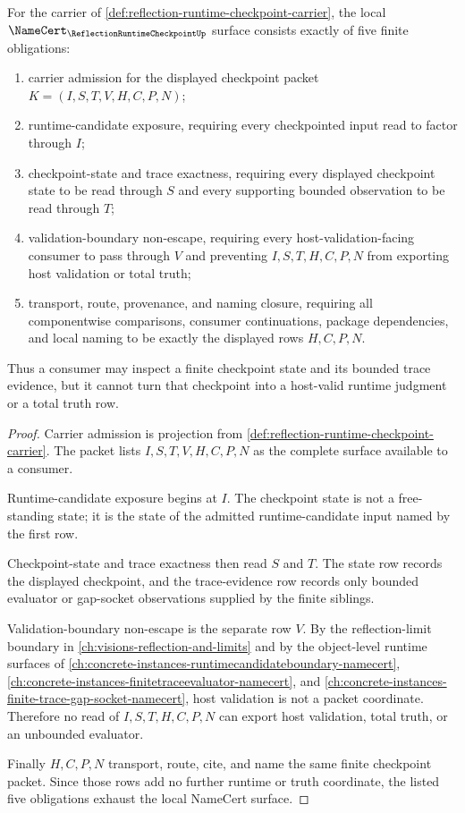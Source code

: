 \begin{theorem}
\label{thm:reflection-runtime-checkpoint-namecert-obligations}
For the carrier of \autoref{def:reflection-runtime-checkpoint-carrier}, the local $\NameCert_{\ReflectionRuntimeCheckpointUp}$ surface consists exactly of five finite obligations:
\begin{enumerate}
\item carrier admission for the displayed checkpoint packet $K=(I,S,T,V,H,C,P,N)$;
\item runtime-candidate exposure, requiring every checkpointed input read to factor through $I$;
\item checkpoint-state and trace exactness, requiring every displayed checkpoint state to be read through $S$ and every supporting bounded observation to be read through $T$;
\item validation-boundary non-escape, requiring every host-validation-facing consumer to pass through $V$ and preventing $I,S,T,H,C,P,N$ from exporting host validation or total truth;
\item transport, route, provenance, and naming closure, requiring all componentwise comparisons, consumer continuations, package dependencies, and local naming to be exactly the displayed rows $H,C,P,N$.
\end{enumerate}
Thus a consumer may inspect a finite checkpoint state and its bounded trace evidence, but it cannot turn that checkpoint into a host-valid runtime judgment or a total truth row.
\end{theorem}
\begin{proof}
Carrier admission is projection from \autoref{def:reflection-runtime-checkpoint-carrier}. The packet lists $I,S,T,V,H,C,P,N$ as the complete surface available to a consumer.

Runtime-candidate exposure begins at $I$. The checkpoint state is not a free-standing state; it is the state of the admitted runtime-candidate input named by the first row.

Checkpoint-state and trace exactness then read $S$ and $T$. The state row records the displayed checkpoint, and the trace-evidence row records only bounded evaluator or gap-socket observations supplied by the finite siblings.

Validation-boundary non-escape is the separate row $V$. By the reflection-limit boundary in \autoref{ch:visions-reflection-and-limits} and by the object-level runtime surfaces of \autoref{ch:concrete-instances-runtimecandidateboundary-namecert}, \autoref{ch:concrete-instances-finitetraceevaluator-namecert}, and \autoref{ch:concrete-instances-finite-trace-gap-socket-namecert}, host validation is not a packet coordinate. Therefore no read of $I,S,T,H,C,P,N$ can export host validation, total truth, or an unbounded evaluator.

Finally $H,C,P,N$ transport, route, cite, and name the same finite checkpoint packet. Since those rows add no further runtime or truth coordinate, the listed five obligations exhaust the local NameCert surface.
\end{proof}
